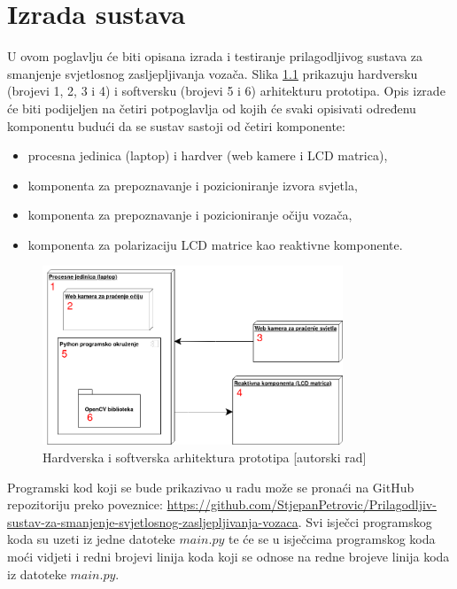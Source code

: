 \documentclass{foi}
\begin{document}
\chapter{Izrada sustava}

U ovom poglavlju će biti opisana izrada i testiranje prilagodljivog sustava za smanjenje svjetlosnog zasljepljivanja vozača. Slika \ref{fig:arhit_hard_soft} prikazuju hardversku (brojevi 1, 2, 3 i 4) i softversku (brojevi 5 i 6) arhitekturu prototipa. Opis izrade će biti podijeljen na četiri potpoglavlja od kojih će svaki opisivati određenu komponentu budući da se sustav sastoji od četiri komponente:
\begin{itemize}[noitemsep]
    \item procesna jedinica (laptop) i hardver (web kamere i LCD matrica),
    \item komponenta za prepoznavanje i pozicioniranje izvora svjetla,
    \item komponenta za prepoznavanje i pozicioniranje očiju vozača,
    \item komponenta za polarizaciju LCD matrice kao reaktivne komponente.
\end{itemize}

\begin{figure}[h!]
    \centering
    \includegraphics[width=0.8\textwidth]{slike/arhit_hard_soft}
    \caption{Hardverska i softverska arhitektura prototipa [autorski rad]}
    \label{fig:arhit_hard_soft}
\end{figure}


Programski kod koji se bude prikazivao u radu može se pronaći na GitHub repozitoriju preko poveznice: \url{https://github.com/StjepanPetrovic/Prilagodljiv-sustav-za-smanjenje-svjetlosnog-zasljepljivanja-vozaca}. Svi isječci programskog koda su uzeti iz jedne datoteke \href{https://github.com/StjepanPetrovic/Prilagodljiv-sustav-za-smanjenje-svjetlosnog-zasljepljivanja-vozaca/blob/main/development/main.py}{$main.py$} te će se u isječcima programskog koda moći vidjeti i redni brojevi linija koda koji se odnose na redne brojeve linija koda iz datoteke \href{https://github.com/StjepanPetrovic/Prilagodljiv-sustav-za-smanjenje-svjetlosnog-zasljepljivanja-vozaca/blob/main/development/main.py}{$main.py$}.
\end{document}
